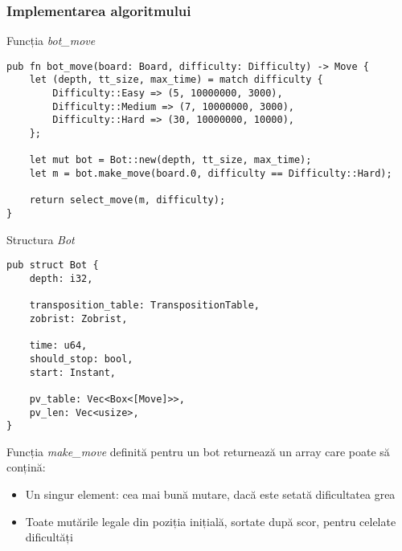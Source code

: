 \vspace{1cm}
\subsubsection{Implementarea algoritmului}
\vspace{1cm}

Funcția \textit{bot\_move}
\begin{lstlisting}[language=RustHtml]
pub fn bot_move(board: Board, difficulty: Difficulty) -> Move {
    let (depth, tt_size, max_time) = match difficulty {
        Difficulty::Easy => (5, 10000000, 3000),
        Difficulty::Medium => (7, 10000000, 3000),
        Difficulty::Hard => (30, 10000000, 10000),
    };

    let mut bot = Bot::new(depth, tt_size, max_time);
    let m = bot.make_move(board.0, difficulty == Difficulty::Hard);

    return select_move(m, difficulty);
}
\end{lstlisting}

Structura \textit{Bot}
\begin{lstlisting}[language=RustHtml]
pub struct Bot {
    depth: i32,

    transposition_table: TranspositionTable,
    zobrist: Zobrist,

    time: u64,
    should_stop: bool,
    start: Instant,

    pv_table: Vec<Box<[Move]>>,
    pv_len: Vec<usize>,
}
\end{lstlisting}

Funcția \textit{make\_move} definită pentru un bot returnează un array care poate să conțină:
\begin{itemize}
	\item Un singur element: cea mai bună mutare, dacă este setată dificultatea grea
	\item Toate mutările legale din poziția inițială, sortate după scor, pentru celelate
	      dificultăți
\end{itemize}

